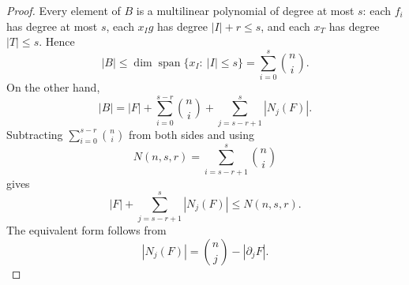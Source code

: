 \documentclass[10pt,a4paper]{amsart}
\begin{document}
\begin{proof}
Every element of $B$ is a multilinear polynomial of degree at most $s$: each $f_i$ has degree at
most $s$, each $x_Ig$ has degree $|I|+r\le s$, and each $x_T$ has degree $|T|\le s$. Hence
$$
|B|\le \dim\operatorname{span}\{x_I:\ |I|\le s\}
 =\sum_{i=0}^{s}\binom{n}{i}.
$$
On the other hand,
$$
|B|=|F|+\sum_{i=0}^{s-r}\binom{n}{i}+\sum_{j=s-r+1}^{s}|N_j(F)|.
$$
Subtracting $\sum_{i=0}^{s-r}\binom{n}{i}$ from both sides and using
$$
N(n,s,r)=\sum_{i=s-r+1}^{s}\binom{n}{i}
$$
gives
$$
|F|+\sum_{j=s-r+1}^{s}|N_j(F)|\le N(n,s,r).
$$
The equivalent form follows from
$$
|N_j(F)|=\binom{n}{j}-|\partial_jF|.
$$
\end{proof}
\end{document}
